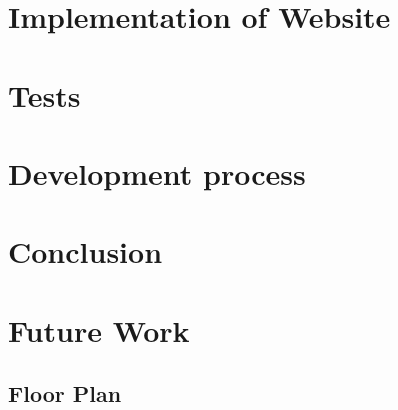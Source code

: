 \chapter{Implementation of Website}


\chapter{Tests}




\chapter{Development process}



\chapter{Conclusion}
\label{chap:conclusion}

\chapter{Future Work}


\begin{appendices}
\chapter{Floor Plan}\label{appendixStart}

\label{appendixEnd}
\end{appendices}

\cleardoublepage
\listoffigures*


\cleardoublepage
\renewcommand{\lstlistlistingname}{List of Listings}%
\lstlistoflistings

\cleardoublepage
{}
\label{chap:bib}%


\label{lastpage}%

\ifthenelse{\isodd{\thepage}}
{%
}
{%
\pagebreak
\thispagestyle{empty}
\mbox{}
}


